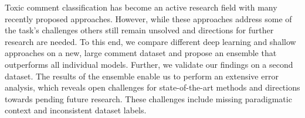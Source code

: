 Toxic comment classification has become an active research field with many recently proposed approaches. However, while these approaches address some of the task's challenges others still remain unsolved and directions for further research are needed. To this end, we compare different deep learning and shallow approaches on a new, large comment dataset and propose an ensemble that outperforms all individual models. Further, we validate our findings on a second dataset. The results of the ensemble enable us to perform an extensive error analysis, which reveals open challenges for state-of-the-art methods and directions towards pending future research. These challenges include missing paradigmatic context and inconsistent dataset labels.
